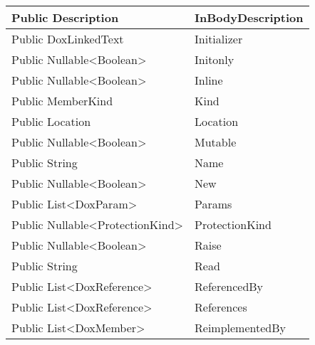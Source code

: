 \documentclass[11pt, oneside, a4paper]{book}
\begin{document}
\begin{center}
\begin{tabular}{| p{3cm} | p{12cm} | }
 Public  Description &  InBodyDescription\hypertarget{SoftwareEngineeringTools.{}Documentation.{}DoxEnumValue.{}InBodyDescription}{}\\
\hline
 Public  DoxLinkedText &  Initializer\hypertarget{SoftwareEngineeringTools.{}Documentation.{}DoxEnumValue.{}Initializer}{}\\
\hline
 Public  Nullable<Boolean> &  Initonly\hypertarget{SoftwareEngineeringTools.{}Documentation.{}DoxEnumValue.{}Initonly}{}\\
\hline
 Public  Nullable<Boolean> &  Inline\hypertarget{SoftwareEngineeringTools.{}Documentation.{}DoxEnumValue.{}Inline}{}\\
\hline
 Public  MemberKind &  Kind\hypertarget{SoftwareEngineeringTools.{}Documentation.{}DoxEnumValue.{}Kind}{}\\
\hline
 Public  Location &  Location\hypertarget{SoftwareEngineeringTools.{}Documentation.{}DoxEnumValue.{}Location}{}\\
\hline
 Public  Nullable<Boolean> &  Mutable\hypertarget{SoftwareEngineeringTools.{}Documentation.{}DoxEnumValue.{}Mutable}{}\\
\hline
 Public  String &  Name\hypertarget{SoftwareEngineeringTools.{}Documentation.{}DoxEnumValue.{}Name}{}\\
\hline
 Public  Nullable<Boolean> &  New\hypertarget{SoftwareEngineeringTools.{}Documentation.{}DoxEnumValue.{}New}{}\\
\hline
 Public  List<DoxParam> &  Params\hypertarget{SoftwareEngineeringTools.{}Documentation.{}DoxEnumValue.{}Params}{}\\
\hline
 Public  Nullable<ProtectionKind> &  ProtectionKind\hypertarget{SoftwareEngineeringTools.{}Documentation.{}DoxEnumValue.{}ProtectionKind}{}\\
\hline
 Public  Nullable<Boolean> &  Raise\hypertarget{SoftwareEngineeringTools.{}Documentation.{}DoxEnumValue.{}Raise}{}\\
\hline
 Public  String &  Read\hypertarget{SoftwareEngineeringTools.{}Documentation.{}DoxEnumValue.{}Read}{}\\
\hline
 Public  List<DoxReference> &  ReferencedBy\hypertarget{SoftwareEngineeringTools.{}Documentation.{}DoxEnumValue.{}ReferencedBy}{}\\
\hline
 Public  List<DoxReference> &  References\hypertarget{SoftwareEngineeringTools.{}Documentation.{}DoxEnumValue.{}References}{}\\
\hline
 Public  List<DoxMember> &  ReimplementedBy\hypertarget{SoftwareEngineeringTools.{}Documentation.{}DoxEnumValue.{}ReimplementedBy}{}\\

\end{tabular}
\end{center}
\end{document}
